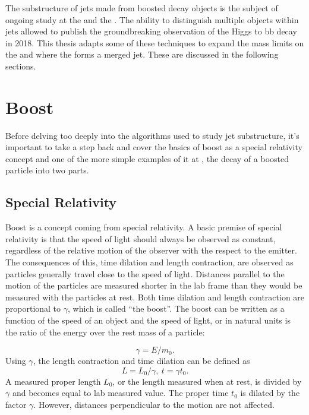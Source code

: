 The substructure of jets made from boosted decay objects is the subject of ongoing study at the \CMS and the \LHC. The ability to distinguish multiple objects within jets allowed \CMS to publish the groundbreaking observation of the Higgs to bb decay in 2018. This thesis adapts some of these techniques to expand the mass limits on the \WR and \NR where the \NR forms a merged jet. These are discussed in the following sections.

\section{Boost}
Before delving too deeply into the algorithms used to study jet substructure, it's important to take a step back and cover the basics of boost as a special relativity concept and one of the more simple examples of it at \CMS, the decay of a boosted particle into two parts.
\subsection{Special Relativity}
Boost is a concept coming from special relativity. A basic premise of special relativity is that the speed of light should always be observed as constant, regardless of the relative motion of the observer with the respect to the emitter.
The consequences of this, time dilation and length contraction, are observed as particles generally travel close to the speed of light. Distances parallel to the motion of the particles are measured shorter in the lab frame than they would be measured with the particles at rest. Both time dilation and length contraction are proportional to $\gamma$, which is called ``the boost''. The boost can be written as a function of the speed of an object and the speed of light, or in natural units is the ratio of the energy over the rest mass of a particle:

\begin{equation}
    \label{eq:lengthcontraction}
    \gamma
    =
    E / m_{0} .
\end{equation}
Using $\gamma$, the length contraction and time dilation can be defined as
\begin{equation}
    \label{eq:lengthandtime}
    L
    =
    L_{0} / \gamma ,
    \  
    t
    =
    \gamma t_{0} .
\end{equation}
 A measured proper length $L_0$, or the length measured when at rest, is divided by $\gamma$ and becomes equal to lab measured value. The proper time $t_0$ is dilated by the factor $\gamma$. However, distances perpendicular to the motion are not affected.

